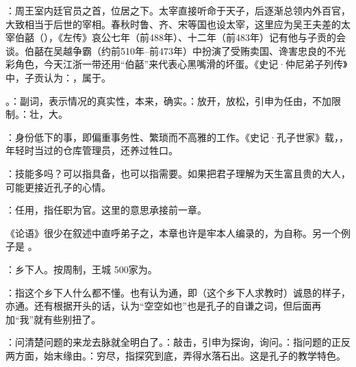 {
\item {}：周王室内廷官员之首，位居之下。太宰直接听命于天子，后逐渐总领内外百官，大致相当于后世的宰相。春秋时鲁、齐、宋等国也设太宰，这里应为吴王夫差的太宰伯嚭（），《左传》哀公七年（前488年）、十二年（前483年）记有他与子贡的会谈。伯嚭在吴越争霸（约前510年--前473年）中扮演了受贿卖国、谗害忠良的不光彩角色，今天江浙一带还用“伯嚭”来代表心黑嘴滑的坏蛋。《史记·仲尼弟子列传》中，子贡认为：，属于。

\item {}。：副词，表示情况的真实性，本来，确实。：放开，放松，引申为任由，不加限制。：壮，大。

\item {}：身份低下的事，即偏重事务性、繁琐而不高雅的工作。《史记·孔子世家》载，，年轻时当过的仓库管理员，还养过牲口。

\item {}：技能多吗？可以指具备，也可以指需要。如果把君子理解为天生富且贵的大人，可能更接近孔子的心情。
}
{}


{
\begin{lyblobitemize}
\item {}：任用，指任职为官。这里的意思承接前一章。
\end{lyblobitemize}
《论语》很少在叙述中直呼弟子之，本章也许是牢本人编录的，为自称。另一个例子是  。
}
{}


{
\item {}：乡下人。按周制，王城 500家为。
\item {}：指这个乡下人什么都不懂。也有认为通，即（这个乡下人求教时）诚恳的样子，亦通。还有根据开头的话，认为“空空如也”也是孔子的自谦之词，但后面再加“我”就有些别扭了。
\item {}：问清楚问题的来龙去脉就全明白了。：敲击，引申为探询，询问。：指问题的正反两方面，始末缘由。：穷尽，指探究到底，弄得水落石出。这是孔子的教学特色。
}
{}


